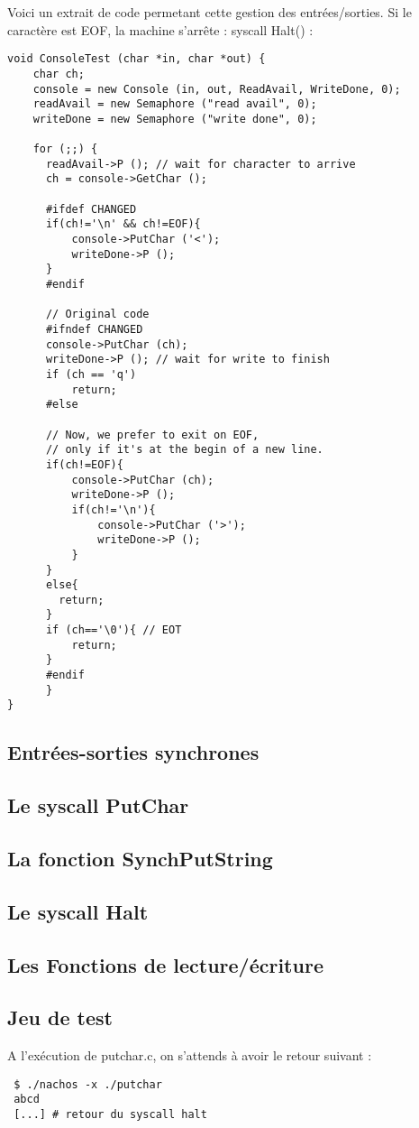 \documentclass[a4paper,10pt]{article}
\begin{document}
Voici un extrait de code permetant cette gestion des entrées/sorties. Si le caractère est EOF, la machine s'arrête : syscall Halt() :
\begin{lstlisting}[frame=single]
void ConsoleTest (char *in, char *out) {
    char ch;
    console = new Console (in, out, ReadAvail, WriteDone, 0);
    readAvail = new Semaphore ("read avail", 0);
    writeDone = new Semaphore ("write done", 0);

    for (;;) {
	  readAvail->P (); // wait for character to arrive
	  ch = console->GetChar ();
	  
	  #ifdef CHANGED
	  if(ch!='\n' && ch!=EOF){
		  console->PutChar ('<');
		  writeDone->P ();
	  }
	  #endif
	  
	  // Original code
	  #ifndef CHANGED 
	  console->PutChar (ch);
	  writeDone->P (); // wait for write to finish
	  if (ch == 'q')
		  return;
	  #else
	  
	  // Now, we prefer to exit on EOF,
	  // only if it's at the begin of a new line.
	  if(ch!=EOF){
		  console->PutChar (ch);
		  writeDone->P ();
		  if(ch!='\n'){
			  console->PutChar ('>');
			  writeDone->P ();
		  }
	  }
	  else{
		return;
	  }
	  if (ch=='\0'){ // EOT
		  return;
	  }
      #endif
      }
}
\end{lstlisting}



\subsection{Entrées-sorties synchrones}
\subsection{Le syscall PutChar}
\subsection{La fonction SynchPutString}
\subsection{Le syscall Halt}
\subsection{Les Fonctions de lecture/écriture}
\subsection{Jeu de test}
A l'exécution de putchar.c, on s'attends à avoir le retour suivant :
\begin{verbatim}
 $ ./nachos -x ./putchar
 abcd
 [...] # retour du syscall halt
\end{verbatim}
\end{document}
